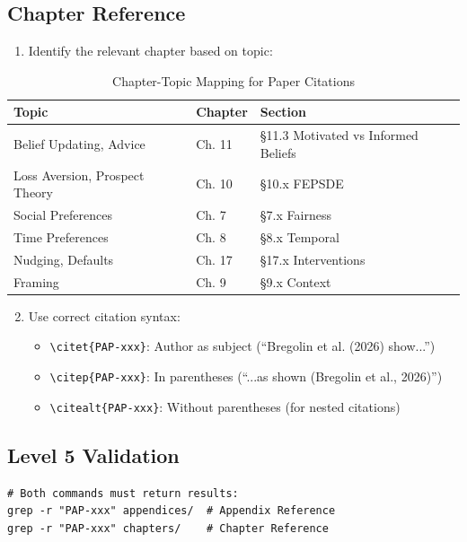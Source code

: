 \subsection{Chapter Reference}

\begin{enumerate}
    \item Identify the relevant chapter based on topic:
\end{enumerate}

\begin{table}[htbp]
\centering
\caption{Chapter-Topic Mapping for Paper Citations}
\label{tab:chapter-mapping}
\begin{tabular}{@{}lll@{}}
\toprule
\textbf{Topic} & \textbf{Chapter} & \textbf{Section} \\
\midrule
Belief Updating, Advice & Ch. 11 & \S11.3 Motivated vs Informed Beliefs \\
Loss Aversion, Prospect Theory & Ch. 10 & \S10.x FEPSDE \\
Social Preferences & Ch. 7 & \S7.x Fairness \\
Time Preferences & Ch. 8 & \S8.x Temporal \\
Nudging, Defaults & Ch. 17 & \S17.x Interventions \\
Framing & Ch. 9 & \S9.x Context \\
\bottomrule
\end{tabular}
\end{table}

\begin{enumerate}
    \setcounter{enumi}{1}
    \item Use correct citation syntax:
    \begin{itemize}
        \item \texttt{\textbackslash citet\{PAP-xxx\}}: Author as subject (``Bregolin et al. (2026) show...'')
        \item \texttt{\textbackslash citep\{PAP-xxx\}}: In parentheses (``...as shown (Bregolin et al., 2026)'')
        \item \texttt{\textbackslash citealt\{PAP-xxx\}}: Without parentheses (for nested citations)
    \end{itemize}
\end{enumerate}

\subsection{Level 5 Validation}

\begin{verbatim}
# Both commands must return results:
grep -r "PAP-xxx" appendices/  # Appendix Reference
grep -r "PAP-xxx" chapters/    # Chapter Reference
\end{verbatim}

